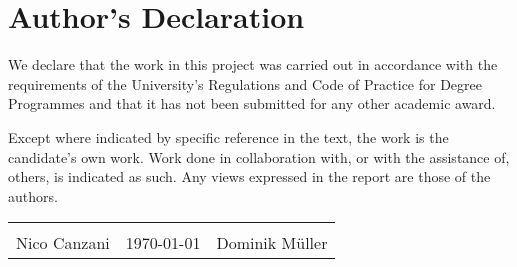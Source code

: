\section*{Author's Declaration}

We declare that the work in this project was carried out in accordance with the requirements of the University's Regulations and Code of Practice for Degree Programmes and that it has not been submitted for any other academic award.


Except where indicated by specific reference in the text, the work is the candidate's own work. Work done in collaboration with, or with the assistance of, others, is indicated as such. Any views expressed in the report are those of the authors.

\vspace{1cm}

\begin{table}[h]
  \renewcommand{\arraystretch}{1.5}
  \begin{tabularx}{\textwidth}{C{5cm} >{\centering}X C{5cm}}
     & & \\  
    Nico Canzani & \today & Dominik M\"uller \\
  \end{tabularx}
\end{table}
